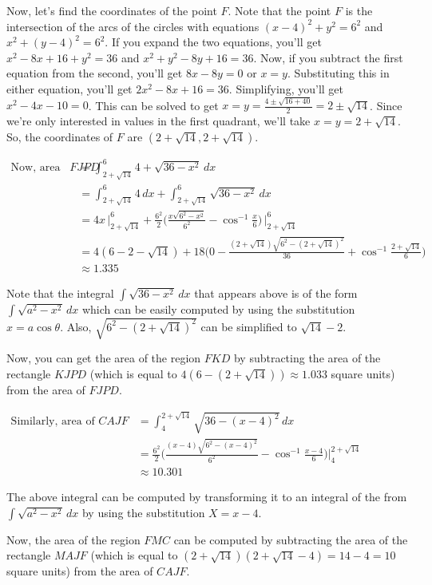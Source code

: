 \documentclass{article}
\begin{document}
Now, let's find the coordinates of the point $F$. Note that the point $F$ is the intersection of the arcs of the circles with equations $(x - 4)^2 + y^2 = 6^2$ and $x^2 + (y - 4)^2 = 6^2$. If you expand the two equations, you'll get $x^2 - 8x + 16 + y^2 = 36$ and $x^2 + y^2 - 8y + 16 = 36$. Now, if you subtract the first equation from the second, you'll get $8x - 8y = 0$ or $x = y$. Substituting this in either equation, you'll get $2x^2 - 8x + 16 = 36$. Simplifying, you'll get $x^2 - 4x - 10 = 0$. This can be solved to get $x = y = \frac{4 \pm \sqrt{16 + 40}}{2} = 2 \pm \sqrt{14}$. Since we're only interested in values in the first quadrant, we'll take $x = y = 2 + \sqrt{14}$. So, the coordinates of $F$ are $(2 + \sqrt{14}, 2 + \sqrt{14})$.
\\
\par
$\begin{aligned}
\text{Now, area of } FJPD & = \int_{2 + \sqrt{14}}^6 4 + \sqrt{36 - x^2} \, dx \\
& = \int_{2 + \sqrt{14}}^6 4 \, dx + \int_{2 + \sqrt{14}}^6 \sqrt{36 - x^2} \, dx \\
& = 4x \, \biggr\rvert_{2 + \sqrt{14}}^6 + \frac{6^2}{2}\Biggl(\frac{x \sqrt{6^2 - x^2}}{6^2} - \cos^{-1} \frac{x}{6} \Biggr) \, \biggr\rvert_{2 + \sqrt{14}}^6 \\
& = 4 (6 - 2 - \sqrt{14}) + 18 \Biggl( 0 - \frac{(2 + \sqrt{14}) \sqrt{6^2 - (2 + \sqrt{14})^2}}{36} + \cos^{-1} \frac{2 + \sqrt{14}}{6} \Biggr) \\
& \approx 1.335
\end{aligned}$
\\
\par
Note that the integral $\int \sqrt{36 - x^2} \, dx$ that appears above is of the form $\int \sqrt{a^2 - x^2} \, dx$ which can be easily computed by using the substitution $x = a \cos \theta$. Also, $\sqrt{6^2 - (2 + \sqrt{14})^2}$ can be simplified to $\sqrt{14} - 2$.

Now, you can get the area of the region $FKD$ by subtracting the area of the rectangle $KJPD$ (which is equal to $4(6 - (2 + \sqrt{14})) \approx 1.033$ square units) from the area of $FJPD$.
\\
\par
$\begin{aligned}
\text{Similarly, area of } CAJF & = \int_4^{2 + \sqrt{14}} \sqrt{36 - (x - 4)^2} \, dx \\
& = \frac{6^2}{2} \Biggl( \frac{(x - 4) \sqrt{6^2 - (x - 4)^2}}{6^2} - \cos^{-1} \frac{x - 4}{6} \Biggr) \biggr\rvert_4^{2 + \sqrt{14}} \\
& \approx 10.301
\end{aligned}$
\\
\par
The above integral can be computed by transforming it to an integral of the from $\int \sqrt{a^2 - x^2} \, dx$ by using the substitution $X = x - 4$.

Now, the area of the region $FMC$ can be computed by subtracting the area of the rectangle $MAJF$ (which is equal to $(2 + \sqrt{14})(2 + \sqrt{14} - 4) = 14 - 4 = 10$ square units) from the area of $CAJF$.
\end{document}
